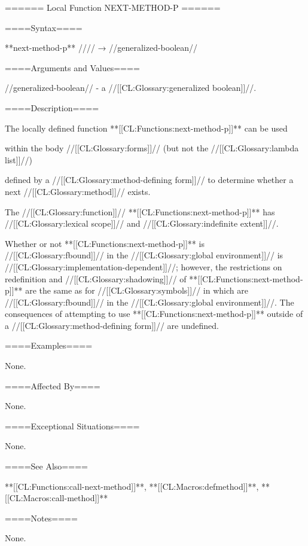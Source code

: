 ====== Local Function NEXT-METHOD-P ======

====Syntax====

**next-method-p** //\noargs// → //generalized-boolean//

====Arguments and Values====

//generalized-boolean// - a //[[CL:Glossary:generalized boolean]]//.

====Description====

The locally defined function **[[CL:Functions:next-method-p]]** can be used

within the body //[[CL:Glossary:forms]]// (but not the //[[CL:Glossary:lambda list]]//)

defined by a //[[CL:Glossary:method-defining form]]// to determine whether a next //[[CL:Glossary:method]]// exists.

The //[[CL:Glossary:function]]// **[[CL:Functions:next-method-p]]** has //[[CL:Glossary:lexical scope]]// and //[[CL:Glossary:indefinite extent]]//.


Whether or not **[[CL:Functions:next-method-p]]** is //[[CL:Glossary:fbound]]// in the //[[CL:Glossary:global environment]]// is //[[CL:Glossary:implementation-dependent]]//; however, the restrictions on redefinition and //[[CL:Glossary:shadowing]]// of **[[CL:Functions:next-method-p]]** are the same as for //[[CL:Glossary:symbols]]// in  which are //[[CL:Glossary:fbound]]// in the //[[CL:Glossary:global environment]]//. The consequences of attempting to use **[[CL:Functions:next-method-p]]** outside of a //[[CL:Glossary:method-defining form]]// are undefined.

====Examples====

None.

====Affected By====

None.

====Exceptional Situations====

None.

====See Also====

**[[CL:Functions:call-next-method]]**, **[[CL:Macros:defmethod]]**, **[[CL:Macros:call-method]]**

====Notes====

None.


 
